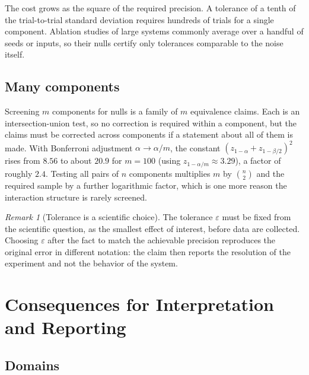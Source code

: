 \documentclass[11pt]{article}
\theoremstyle{definition}
\theoremstyle{remark}
\newtheorem{remark}[theorem]{Remark}
\begin{document}
The cost grows as the square of the required precision. A tolerance of a tenth of the trial-to-trial standard deviation requires hundreds of trials for a single component. Ablation studies of large systems commonly average over a handful of seeds or inputs, so their nulls certify only tolerances comparable to the noise itself.

\subsection{Many components}

Screening $m$ components for nulls is a family of $m$ equivalence claims. Each is an intersection-union test, so no correction is required within a component, but the claims must be corrected across components if a statement about all of them is made. With Bonferroni adjustment $\alpha\to\alpha/m$, the constant $(z_{1-\alpha}+z_{1-\beta/2})^2$ rises from $8.56$ to about $20.9$ for $m=100$ (using $z_{1-\alpha/m}\approx3.29$), a factor of roughly $2.4$. Testing all pairs of $n$ components multiplies $m$ by $\binom n2$ and the required sample by a further logarithmic factor, which is one more reason the interaction structure is rarely screened.

\begin{remark}[Tolerance is a scientific choice]
The tolerance $\varepsilon$ must be fixed from the scientific question, as the smallest effect of interest, before data are collected. Choosing $\varepsilon$ after the fact to match the achievable precision reproduces the original error in different notation: the claim then reports the resolution of the experiment and not the behavior of the system.
\end{remark}

\section{Consequences for Interpretation and Reporting}\label{sec:practice}

\subsection{Domains}
\end{document}
